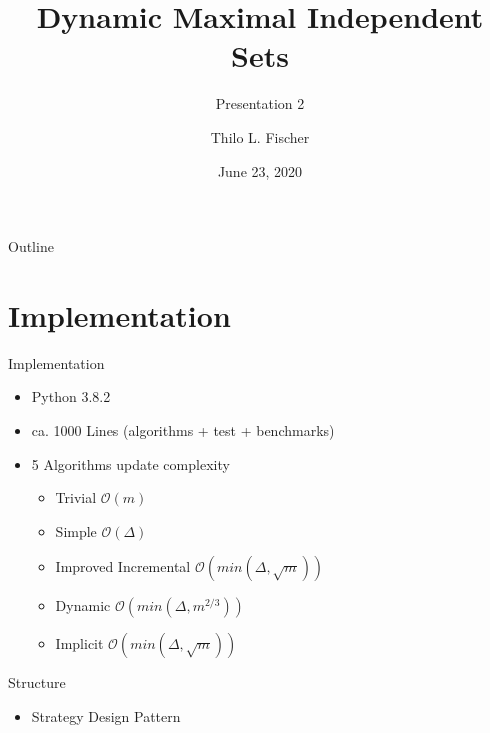 \documentclass{beamer}
\title{Dynamic Maximal Independent Sets}
\subtitle{Presentation 2}
\author{Thilo L. Fischer}
\date{June 23, 2020}
\begin{document}
\begin{frame}
  \titlepage
\end{frame}

\begin{frame}{Outline}
  \tableofcontents
\end{frame}

\section{Implementation}
\begin{frame}{Implementation}

  \begin{itemize}
    \item Python 3.8.2
    \item ca. 1000 Lines (algorithms + test + benchmarks)
      \bigskip
    \item 5 Algorithms \hfill update complexity
      \begin{itemize}
        \item Trivial \hfill $\mathcal{O}(m)$
        \item Simple \hfill $\mathcal{O}(\Delta)$
        \item Improved Incremental \hfill $\mathcal{O}(min(\Delta, \sqrt{m}))$
        \item Dynamic \hfill $\mathcal{O}(min(\Delta, m^{2/3}))$
        \item Implicit \hfill $\mathcal{O}(min(\Delta, \sqrt{m}))$
      \end{itemize}
  \end{itemize}

\end{frame}
\begin{frame}{Structure}
  \begin{itemize}
    \item Strategy Design Pattern
  \end{itemize}
  \begin{center}
  \end{center}
\end{frame}
\end{document}
